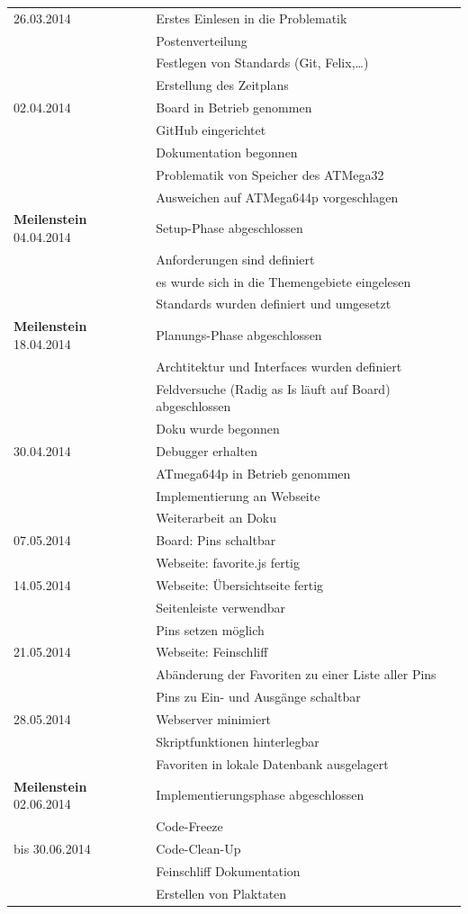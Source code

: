 \begin{longtable}{ll}
26.03.2014 & Erstes Einlesen in die Problematik \\
& Postenverteilung\\
& Festlegen von Standards (Git, Felix,\ldots) \\
& Erstellung des Zeitplans \\
02.04.2014 & Board in Betrieb genommen\\
& GitHub eingerichtet\\ 
&Dokumentation begonnen\\ 
& Problematik von Speicher des ATMega32\\
& Ausweichen auf ATMega644p vorgeschlagen \\
\textbf{Meilenstein} 04.04.2014 & Setup-Phase abgeschlossen \\
& Anforderungen sind definiert\\
& es wurde sich in die 
Themengebiete eingelesen\\
& Standards wurden definiert und umgesetzt\\
\textbf{Meilenstein} 18.04.2014 & Planungs-Phase abgeschlossen \\
& Archtitektur und Interfaces wurden definiert\\
& Feldversuche (Radig as Is läuft auf Board) abgeschlossen \\
& Doku wurde begonnen\\
30.04.2014 & Debugger erhalten\\
& ATmega644p in Betrieb genommen\\
& Implementierung an Webseite\\
& Weiterarbeit an Doku \\
07.05.2014 & Board: Pins schaltbar \\
& Webseite: favorite.js fertig \\
14.05.2014 & Webseite: Übersichtseite fertig\\
& Seitenleiste verwendbar\\
& Pins setzen möglich\\
21.05.2014 & Webseite: Feinschliff\\ 
&Abänderung der Favoriten zu einer Liste aller Pins\\
& Pins zu Ein- und Ausgänge schaltbar \\
28.05.2014 & Webserver minimiert\\
& Skriptfunktionen hinterlegbar\\
& Favoriten in lokale Datenbank ausgelagert \\
\textbf{Meilenstein} 02.06.2014 & Implementierungsphase abgeschlossen \\
& Code-Freeze\\
bis 30.06.2014 & Code-Clean-Up\\
& Feinschliff Dokumentation\\
& Erstellen von Plaktaten\\
\end{longtable}


